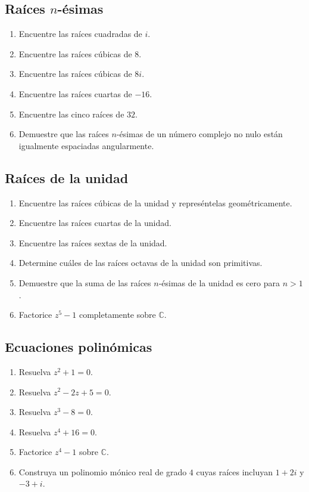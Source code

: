 \documentclass[12pt]{article}
\begin{document}
\subsection*{Raíces $n$-ésimas}
\begin{enumerate}
\item Encuentre las raíces cuadradas de $i$.
\item Encuentre las raíces cúbicas de $8$.
\item Encuentre las raíces cúbicas de $8i$.
\item Encuentre las raíces cuartas de $-16$.
\item Encuentre las cinco raíces de $32$.
\item Demuestre que las raíces $n$-ésimas de un número complejo no nulo están igualmente espaciadas angularmente.
\end{enumerate}

\subsection*{Raíces de la unidad}
\begin{enumerate}
\item Encuentre las raíces cúbicas de la unidad y represéntelas geométricamente.
\item Encuentre las raíces cuartas de la unidad.
\item Encuentre las raíces sextas de la unidad.
\item Determine cuáles de las raíces octavas de la unidad son primitivas.
\item Demuestre que la suma de las raíces $n$-ésimas de la unidad es cero para $n>1$.
\item Factorice $z^5-1$ completamente sobre $\mathbb{C}$.
\end{enumerate}

\subsection*{Ecuaciones polinómicas}
\begin{enumerate}
\item Resuelva $z^2+1=0$.
\item Resuelva $z^2-2z+5=0$.
\item Resuelva $z^3-8=0$.
\item Resuelva $z^4+16=0$.
\item Factorice $z^4-1$ sobre $\mathbb{C}$.
\item Construya un polinomio mónico real de grado $4$ cuyas raíces incluyan $1+2i$ y $-3+i$.
\end{enumerate}
\end{document}
